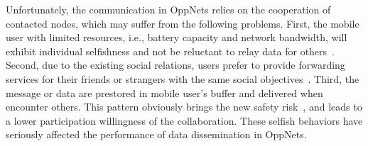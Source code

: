 Unfortunately,
the communication in OppNets relies on
the cooperation of contacted nodes,
which may suffer from the following problems.
First,
the mobile user with limited resources,
i.e.,
battery capacity
and network bandwidth,
will exhibit individual selfishness and not be
reluctant to relay data for others~\cite{DBLP:journals/comsur/JedariXN18}.
Second,
due to the existing social relations,
users prefer to
provide forwarding services for their friends or strangers
with the same social objectives~\cite{DBLP:journals/tmc/HanHKMSS12}.
Third,
the message or data are prestored in mobile user's buffer
and delivered when encounter others.
This pattern obviously brings
the new safety risk~\cite{Saha2018Design},
and leads to a lower participation willingness of the collaboration.
These selfish behaviors have seriously
affected the performance
of data dissemination in OppNets.
%


